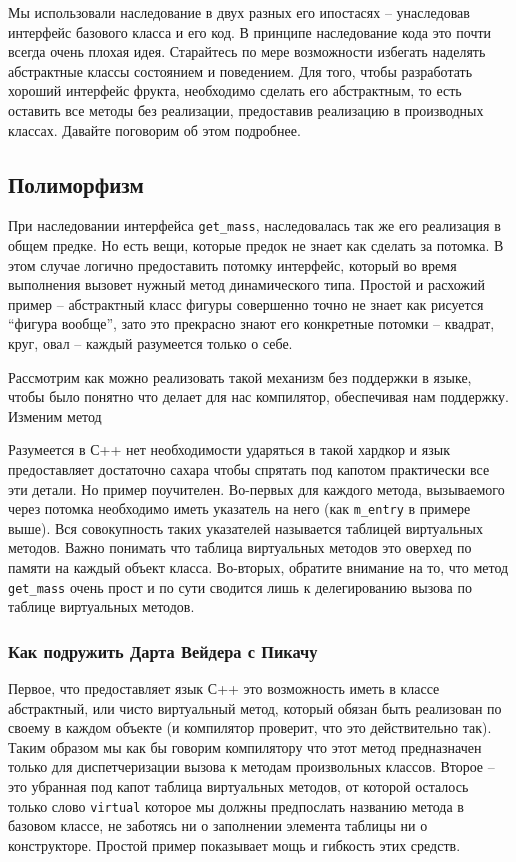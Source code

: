 \documentclass[a4paper,12pt,oneside]{article}
\begin{document}
Мы использовали наследование в двух разных его ипостасях – унаследовав интерфейс базового класса и его код. В принципе наследование кода это почти всегда очень плохая идея. Старайтесь по мере возможности избегать наделять абстрактные классы состоянием и поведением. Для того, чтобы разработать хороший интерфейс фрукта, необходимо сделать его абстрактным, то есть оставить все методы без реализации, предоставив реализацию в производных классах. Давайте поговорим об этом подробнее.

\subsection{Полиморфизм}

При наследовании интерфейса \lstinline!get_mass!, наследовалась так же его реализация в общем предке. Но есть вещи, которые предок не знает как сделать за потомка. В этом случае логично предоставить потомку интерфейс, который во время выполнения вызовет нужный метод динамического типа. Простой и расхожий пример -- абстрактный класс фигуры совершенно точно не знает как рисуется ``фигура вообще'', зато это прекрасно знают его конкретные потомки -- квадрат, круг, овал -- каждый разумеется только о себе.

Рассмотрим как можно реализовать такой механизм без поддержки в языке, чтобы было понятно что делает для нас компилятор, обеспечивая нам поддержку. Изменим метод 



Разумеется в С++ нет необходимости ударяться в такой хардкор и язык предоставляет достаточно сахара чтобы спрятать под капотом практически все эти детали. Но пример поучителен. Во-первых для каждого метода, вызываемого через потомка необходимо иметь указатель на него (как \lstinline!m_entry! в примере выше). Вся совокупность таких указателей называется таблицей виртуальных методов. Важно понимать что таблица виртуальных методов это оверхед по памяти на каждый объект класса. Во-вторых, обратите внимание на то, что метод \lstinline!get_mass! очень прост и по сути сводится лишь к делегированию вызова по таблице виртуальных методов.

\subsubsection{Как подружить Дарта Вейдера с Пикачу}\label{VirtualPolymorph}

Первое, что предоставляет язык С++ это возможность иметь в классе абстрактный, или чисто виртуальный метод, который обязан быть реализован по своему в каждом объекте (и компилятор проверит, что это действительно так). Таким образом мы как бы говорим компилятору что этот метод предназначен только для диспетчеризации вызова к методам произвольных классов. Второе -- это убранная под капот таблица виртуальных методов, от которой осталось только слово \lstinline!virtual! которое мы должны предпослать названию метода в базовом классе, не заботясь ни о заполнении элемента таблицы ни о конструкторе. Простой пример показывает мощь и гибкость этих средств.
\end{document}
